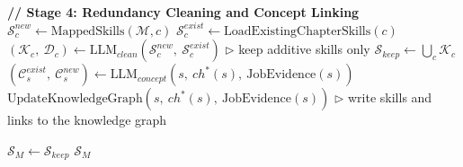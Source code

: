 \documentclass[varwidth=8.25in,border=8pt]{standalone}
\begin{document}
\begin{algorithmic}[1]
\State
\State \textbf{// Stage 4: Redundancy Cleaning and Concept Linking}
    \State $\mathcal{S}^{new}_c \leftarrow \text{MappedSkills}(\mathcal{M}, c)$
    \State $\mathcal{S}^{exist}_c \leftarrow \text{LoadExistingChapterSkills}(c)$
    \State $(\mathcal{K}_c,\ \mathcal{D}_c) \leftarrow \text{LLM}_{clean}(\mathcal{S}^{new}_c,\ \mathcal{S}^{exist}_c)$
    \Statex \hspace{\algorithmicindent} $\triangleright$ keep additive skills only
\EndFor
\State $\mathcal{S}_{keep} \leftarrow \bigcup_c \mathcal{K}_c$
    \State $(\mathcal{C}^{exist}_s,\ \mathcal{C}^{new}_s) \leftarrow \text{LLM}_{concept}(s,\ ch^{*}(s),\ \text{JobEvidence}(s))$
    \State $\text{UpdateKnowledgeGraph}(s,\ ch^{*}(s),\ \text{JobEvidence}(s))$
    \Statex \hspace{\algorithmicindent} $\triangleright$ write skills and links to the knowledge graph
\EndFor

\State
\State $\mathcal{S}_{M} \leftarrow \mathcal{S}_{keep}$
\State \Return $\mathcal{S}_{M}$
\end{algorithmic}
\end{document}
